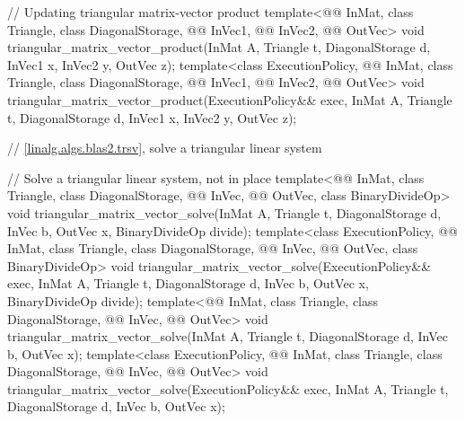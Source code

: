\begin{codeblock}
{  // Updating triangular matrix-vector product
  template<@@ InMat, class Triangle, class DiagonalStorage,
           @@ InVec1, @@ InVec2, @@ OutVec>
    void triangular_matrix_vector_product(InMat A, Triangle t, DiagonalStorage d,
                                          InVec1 x, InVec2 y, OutVec z);
  template<class ExecutionPolicy, @@ InMat, class Triangle, class DiagonalStorage,
           @@ InVec1, @@ InVec2, @@ OutVec>
    void triangular_matrix_vector_product(ExecutionPolicy&& exec,
                                          InMat A, Triangle t, DiagonalStorage d,
                                          InVec1 x, InVec2 y, OutVec z);

  // \ref{linalg.algs.blas2.trsv}, solve a triangular linear system

  // Solve a triangular linear system, not in place
  template<@@ InMat, class Triangle, class DiagonalStorage,
           @@ InVec, @@ OutVec, class BinaryDivideOp>
    void triangular_matrix_vector_solve(InMat A, Triangle t, DiagonalStorage d,
                                        InVec b, OutVec x, BinaryDivideOp divide);
  template<class ExecutionPolicy, @@ InMat, class Triangle, class DiagonalStorage,
           @@ InVec, @@ OutVec, class BinaryDivideOp>
    void triangular_matrix_vector_solve(ExecutionPolicy&& exec,
                                        InMat A, Triangle t, DiagonalStorage d,
                                        InVec b, OutVec x, BinaryDivideOp divide);
  template<@@ InMat, class Triangle, class DiagonalStorage,
           @@ InVec, @@ OutVec>
    void triangular_matrix_vector_solve(InMat A, Triangle t, DiagonalStorage d,
                                        InVec b, OutVec x);
  template<class ExecutionPolicy, @@ InMat, class Triangle, class DiagonalStorage,
           @@ InVec, @@ OutVec>
    void triangular_matrix_vector_solve(ExecutionPolicy&& exec,
                                        InMat A, Triangle t, DiagonalStorage d,
                                        InVec b, OutVec x);

}
\end{codeblock}
